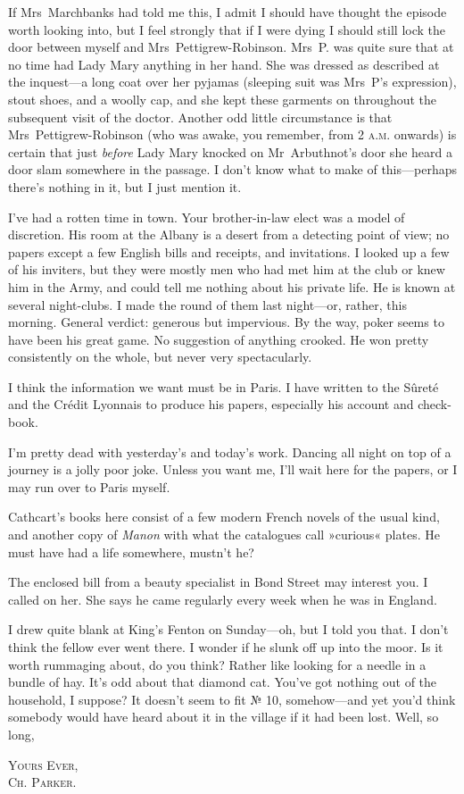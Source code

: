 If Mrs~Marchbanks had told me this, I admit I should have thought the episode worth looking into, but I feel strongly that if I were dying I should still lock the door between myself and Mrs~Pettigrew-Robinson.  Mrs~P. was quite sure that at no time had Lady Mary anything in her hand. She was dressed as described at the inquest—a long coat over her pyjamas (sleeping suit was Mrs~P's expression), stout shoes, and a woolly cap, and she kept these garments on throughout the subsequent visit of the doctor. Another odd little circumstance is that Mrs~Pettigrew-Robinson (who was awake, you remember, from 2 \textsc{a.m.} onwards) is certain that just \textit{before} Lady Mary knocked on Mr~Arbuthnot's door she heard a door slam somewhere in the passage. I don't know what to make of this—perhaps there's nothing in it, but I just mention it.

I've had a rotten time in town. Your brother-in-law elect was a model of discretion. His room at the Albany is a desert from a detecting point of view; no papers except a few English bills and receipts, and invitations. I looked up a few of his inviters, but they were mostly men who had met him at the club or knew him in the Army, and could tell me nothing about his private life. He is known at several night-clubs. I made the round of them last night—or, rather, this morning. General verdict: generous but impervious. By the way, poker seems to have been his great game. No suggestion of anything crooked.  He won pretty consistently on the whole, but never very spectacularly.

I think the information we want must be in Paris. I have written to the Sûreté and the Crédit Lyonnais to produce his papers, especially his account and check-book.

I'm pretty dead with yesterday's and today's work. Dancing all night on top of a journey is a jolly poor joke. Unless you want me, I'll wait here for the papers, or I may run over to Paris myself.

Cathcart's books here consist of a few modern French novels of the usual kind, and another copy of \textit{Manon} with what the catalogues call »curious« plates. He must have had a life somewhere, mustn't he?

The enclosed bill from a beauty specialist in Bond Street may interest you. I called on her. She says he came regularly every week when he was in England.

I drew quite blank at King's Fenton on Sunday—oh, but I told you that. I don't think the fellow ever went there. I wonder if he slunk off up into the moor. Is it worth rummaging about, do you think?  Rather like looking for a needle in a bundle of hay. It's odd about that diamond cat. You've got nothing out of the household, I suppose?  It doesn't seem to fit № 10, somehow—and yet you'd think somebody would have heard about it in the village if it had been lost. Well, so long,

\begin{flushright}
\textsc{Yours Ever,}\\
\textsc{Ch. Parker.}
\end{flushright}
